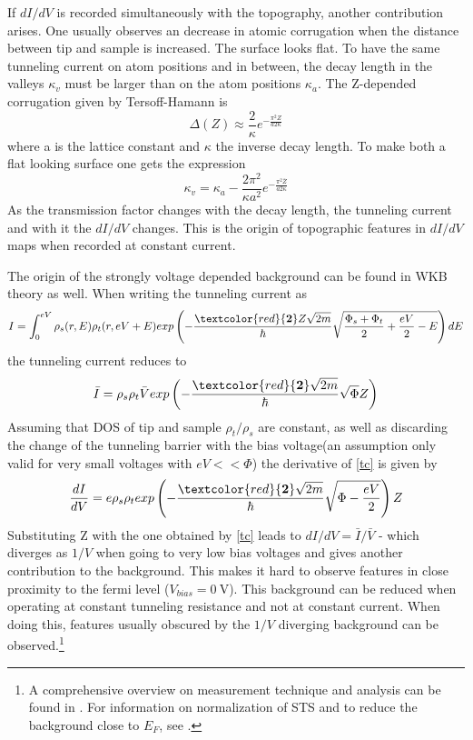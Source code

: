 If $dI/dV$ is recorded simultaneously with the topography, another contribution arises. One usually observes an decrease in atomic corrugation when the distance between tip and sample is increased. The surface looks flat. To have the same tunneling current on atom positions and in between, the decay length in the valleys $\kappa_v$ must be larger than on the atom positions $\kappa_a$. The Z-depended corrugation given by Tersoff-Hamann is $$\Delta(Z)\approx \frac{2}{\kappa}e^{-\frac{\pi^2Z}{a2\kappa}}$$ where a is the lattice constant and $\kappa$ the inverse decay length. To make both a flat looking surface one gets the expression
$$\kappa_v=\kappa_a-\frac{2\pi^2}{\kappa a^2}e^{-\frac{\pi^2\bar Z}{a2\kappa}}$$ 
As the transmission factor changes with the decay length, the tunneling current and with it the $dI/dV$ changes. This is the origin of topographic features in $dI/dV$ maps when recorded at constant current.

The origin of the strongly voltage depended background can be found in WKB theory as well.
When writing the tunneling current as 
$$ I=\int_0^{eV}\rho_s(r,E)\rho_t(r,eV+E)exp\left(-\frac{\textcolor{red}{\textbf{2}}Z\sqrt{2m}}{\hbar}\sqrt{\frac{\Phi_s+\Phi_t}{2}+\frac{eV}{2}-E}\right)dE $$
the tunneling current reduces to 
\begin{equation}
\bar I=\rho_s\rho_t \bar V exp\left(-\frac{\textcolor{red}{\textbf{2}}\sqrt{2m}}{\hbar}\sqrt{\Phi}Z\right)
\label{tc}
\end{equation}
Assuming that DOS of tip and sample $\rho_t/\rho_s$ are constant, as well as discarding the change of the tunneling barrier with the bias voltage(an assumption only valid for very small voltages with $eV<<\Phi$) the derivative of \eqref{tc} is given by
$$\frac{dI}{dV}=e\rho_s\rho_texp\left(-\frac{\textcolor{red}{\textbf{2}}\sqrt{2m}}{\hbar}\sqrt{\Phi-\frac{eV}{2}}\right)Z$$
Substituting Z with the one obtained by \eqref{tc} leads to $dI/dV= \bar I / \bar V$ - which diverges as  $1/V$ when going to very low bias voltages and gives another contribution to the background. This makes it hard to observe features in close proximity to the fermi level ($V_{bias}=\SI{0}{\volt}$). This background can be reduced when operating at constant tunneling resistance and not at constant current. When doing this, features usually obscured by the $1/V$ diverging background can be observed.\footnote{A comprehensive overview on measurement technique and analysis can be found in \cite{bonnell_scanning_1993}. For information on normalization of STS and to reduce the background close to $E_F$, see \cite{feenstra_tunneling_1987}.}

